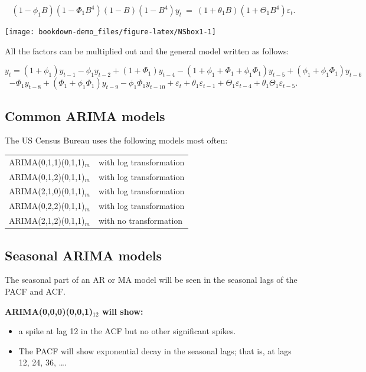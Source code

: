\documentclass[]{book}
\providecommand{\tightlist}{%
  \setlength{\itemsep}{0pt}\setlength{\parskip}{0pt}}
\begin{document}
\[(1 - \phi_{1}B)(1 - \Phi_{1}B^{4}) (1 - B) (1 - B^{4})y_{t} ~= ~
(1 + \theta_{1}B) (1 + \Theta_{1}B^{4})\varepsilon_{t}.
\]

\begin{center}\texttt{[image: bookdown-demo\_files/figure-latex/NSbox1-1]} \end{center}

All the factors can be multiplied out and the general model
written as follows:

\[y_{t} = (1 + \phi_{1})y_{t - 1} - \phi_1y_{t-2} + (1 + \Phi_{1})y_{t - 4}- (1 + \phi_{1} + \Phi_{1} + \phi_{1}\Phi_{1})y_{t - 5}
 + (\phi_{1} + \phi_{1} \Phi_{1}) y_{t - 6}\]
\[- \Phi_{1} y_{t - 8} + (\Phi_{1} + \phi_{1} \Phi_{1}) y_{t - 9}
  - \phi_{1} \Phi_{1} y_{t - 10} + \varepsilon_{t} + \theta_{1}\varepsilon_{t - 1} + \Theta_{1}\varepsilon_{t - 4} + \theta_{1}\Theta_{1}\varepsilon_{t - 5}.\]

\hypertarget{common-arima-models}{%
\subsection{Common ARIMA models}\label{common-arima-models}}

The US Census Bureau uses the following models most often:\vspace*{0.5cm}

\begin{tabular}{|ll|}
\hline
ARIMA(0,1,1)(0,1,1)$_m$& with log transformation\\
ARIMA(0,1,2)(0,1,1)$_m$& with log transformation\\
ARIMA(2,1,0)(0,1,1)$_m$& with log transformation\\
ARIMA(0,2,2)(0,1,1)$_m$& with log transformation\\
ARIMA(2,1,2)(0,1,1)$_m$& with no transformation\\
\hline
\end{tabular}

\hypertarget{seasonal-arima-models-1}{%
\subsection{Seasonal ARIMA models}\label{seasonal-arima-models-1}}

The seasonal part of an AR or MA model will be seen in the seasonal lags of the PACF and ACF.

\textbf{ARIMA(0,0,0)(0,0,1)\(_{12}\) will show:}

\begin{itemize}
\tightlist
\item
  a spike at lag 12 in the ACF but no other significant spikes.
\item
  The PACF will show exponential decay in the seasonal lags; that is, at lags 12, 24, 36, \dots.
\end{itemize}
\end{document}
